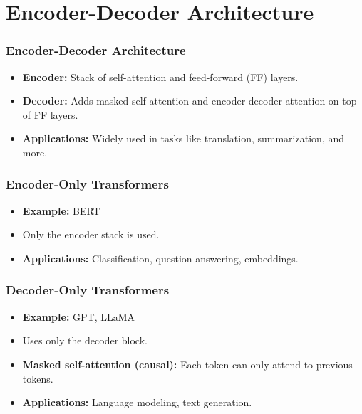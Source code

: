 \section{Encoder-Decoder Architecture}
\begin{frame}
    \frametitle{Encoder-Decoder Architecture}
    \begin{itemize}
        \item \textbf{Encoder:} Stack of self-attention and feed-forward (FF) layers.
        \item \textbf{Decoder:} Adds masked self-attention and encoder-decoder attention on top of FF layers.
        \item \textbf{Applications:} Widely used in tasks like translation, summarization, and more.
    \end{itemize}
\end{frame}

\begin{frame}
    \frametitle{Encoder-Only Transformers}
    \begin{itemize}
        \item \textbf{Example:} BERT
        \item Only the encoder stack is used.
        \item \textbf{Applications:} Classification, question answering, embeddings.
    \end{itemize}
\end{frame}

\begin{frame}
    \frametitle{Decoder-Only Transformers}
    \begin{itemize}
        \item \textbf{Example:} GPT, LLaMA
        \item Uses only the decoder block.
        \item \textbf{Masked self-attention (causal):} Each token can only attend to previous tokens.
        \item \textbf{Applications:} Language modeling, text generation.
    \end{itemize}
\end{frame}